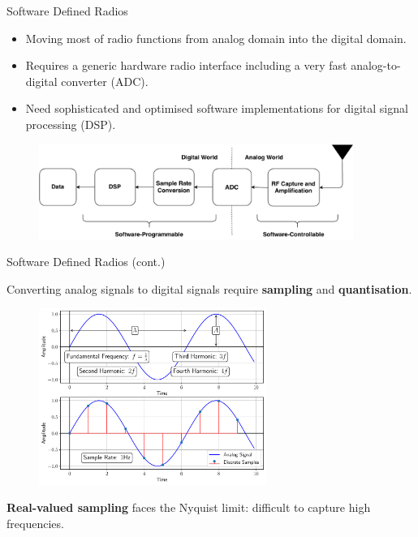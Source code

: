 \documentclass[handout]{beamer}
\begin{document}
\begin{frame}{Software Defined Radios}  

\begin{itemize}
	\footnotesize
	\item Moving most of radio functions from analog domain into the digital domain.
	\vspace{10pt}
	\item Requires a generic hardware radio interface including a very fast analog-to-digital converter (ADC).
	\vspace{10pt}
	\item Need sophisticated and optimised software implementations for digital signal processing (DSP).
\end{itemize}

	\begin{figure}
		\includegraphics[width=290pt]{figures/sdr-architecture.pdf}
	\end{figure}

\end{frame}


\begin{frame}{Software Defined Radios (cont.)}  

	\footnotesize
	Converting analog signals to digital signals require \textbf{sampling} and \textbf{quantisation}. 

	\begin{figure}
		\includegraphics[width=210pt]{figures/signal-properties.pdf}
	\end{figure}

	\footnotesize
	\textbf{Real-valued sampling} faces the Nyquist limit: difficult to capture high frequencies.

\end{frame}
\end{document}

